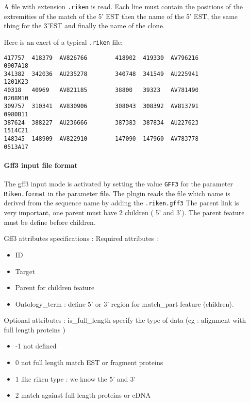 A file with extension \texttt{.riken} is read.  Each line must contain
the positions of the extremities of the match of the 5' EST then the
name of the 5' EST, the same thing for the 3'EST and finally the name
of the clone.

Here is an exert of a typical \texttt{.riken} file:
\begin{Verbatim}[fontsize=\small]
417757  418379  AV826766        418902  419330  AV796216        0907A18
341382  342036  AU235278        340748  341549  AU225941        1201K23
40318   40969   AV821185        38800   39323   AV781490        0208M10
309757  310341  AV830906        308043  308392  AV813791        0980B11
387624  388227  AU236666        387383  387834  AU227623        1514C21
148345  148909  AV822910        147090  147960  AV783778        0513A17
\end{Verbatim}

\paragraph{Gff3 input file format}
The gff3 input mode is activated by setting the value \texttt{GFF3} for the parameter
\texttt{Riken.format} in the parameter file.
The plugin reads the file which name is derived from the sequence name by adding the \texttt{.riken.gff3}
The parent link is very important, one parent must have 2 children ( 5' and 3'). The parent feature must be define before children.

Gff3 attributes specifications :
Required attributes : 
	\begin{itemize}
	\item ID
	\item Target
	\item Parent for children feature
	\item Ontology\_term : define 5' or 3' region for match\_part feature (children).
	\end{itemize}
Optional attributes : 
	is\_full\_length specify the type of data (eg : alignment with full length proteins )
	\begin{itemize}
	\item -1 not defined
	\item 0  not full length match EST or fragment proteins 
	\item 1  like riken type : we know the 5' and 3'
	\item 2  match against full length proteins or cDNA
	\end{itemize}


